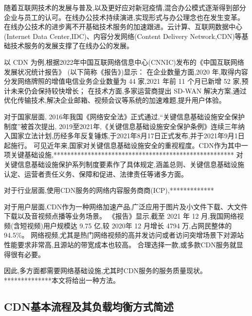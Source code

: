 随着互联网技术的发展与普及,以及更好应对新冠疫情,混合办公模式逐渐得到部分企业与员工的认可。在线办公技术持续演进,实现形式与办公理念也在发生变革。
在线办公技术的进步离不开基础技术服务的加速跟进。云计算、互联网数据中心(Internet Data Center,IDC)、内容分发网络(Content Delivery Network,CDN)等基础技术服务的发展支撑了在线办公的发展。

以 CDN 为例,根据2022年中国互联网络信息中心(CNNIC)发布的《中国互联网络发展状况统计报告》\cite{cnnic2022} (以下简称《报告》)显示：
在企业数量方面,2020 年,取得内容分发网络牌照的增值电信业务企业数量为 44 家,2021 年前 11 个月已新增 52 家,预计未来仍会保持较快增长；
在技术方面,多家运营商提出 SD-WAN 解决方案,通过优化传输技术,解决企业邮箱、视频会议等系统的加速难题,提升用户体验。


对于国家层面,
2016年我国《网络安全法》正式通过,“关键信息基础设施安全保护制度”被首次提出,
2019至2021年,《关键信息基础设施安全保护条例》连续三年纳入国家立法计划,历经多年反复锤炼,于2021年8月17日正式发布,并于2021年9月1日起施行。
可见近年来,国家对关键信息基础设施安全的重视程度。CDN作为其中一项关键基础设施,*****************************************************
对关键信息基础设施保护系列制度要素作了具体规定,涵盖总则、关键信息基础设施认定、运营者责任义务、保障和促进、法律责任等诸多方面。



对于行业层面,使用CDN服务的网络内容服务商商(ICP),*************


对于用户层面,CDN作为一种网络加速产品,广泛应用于图片及小文件下载、大文件下载以及音视频点播等业务场景。
《报告》显示,截至 2021 年 12 月,我国网络视频(含短视频)用户规模达 9.75 亿,较 2020年 12 月增长 4794 万,占网民整体的 94.5\%。
网络视频,尤其是热门网络视频的高并发访问或者访问突增场景下对源站性能要求非常高,且源站的带宽成本也较高。
合理选择一款,或多款CDN服务就显得很有必要。

因此,多方面都需要网络基础设施,尤其时CDN服务的服务质量现状。**************本文将给出一种方法。


\subsection{CDN基本流程及其负载均衡方式简述}


